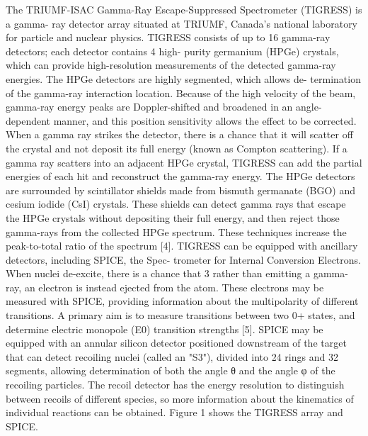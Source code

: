 The TRIUMF-ISAC Gamma-Ray Escape-Suppressed Spectrometer (TIGRESS) is a gamma- ray detector array situated at TRIUMF, Canada’s national laboratory for particle and nuclear physics. TIGRESS consists of up to 16 gamma-ray detectors; each detector contains 4 high- purity germanium (HPGe) crystals, which can provide high-resolution measurements of the detected gamma-ray energies. The HPGe detectors are highly segmented, which allows de- termination of the gamma-ray interaction location. Because of the high velocity of the beam, gamma-ray energy peaks are Doppler-shifted and broadened in an angle-dependent manner, and this position sensitivity allows the effect to be corrected.
When a gamma ray strikes the detector, there is a chance that it will scatter off the crystal and not deposit its full energy (known as Compton scattering). If a gamma ray scatters into an adjacent HPGe crystal, TIGRESS can add the partial energies of each hit and reconstruct the gamma-ray energy. The HPGe detectors are surrounded by scintillator shields made from bismuth germanate (BGO) and cesium iodide (CsI) crystals. These shields can detect gamma rays that escape the HPGe crystals without depositing their full energy, and then reject those gamma-rays from the collected HPGe spectrum. These techniques increase the peak-to-total ratio of the spectrum [4].
TIGRESS can be equipped with ancillary detectors, including SPICE, the Spec- trometer for Internal Conversion Electrons. When nuclei de-excite, there is a chance that
3
rather than emitting a gamma-ray, an electron is instead ejected from the atom. These electrons may be measured with SPICE, providing information about the multipolarity of different transitions. A primary aim is to measure transitions between two 0+ states, and determine electric monopole (E0) transition strengths [5]. SPICE may be equipped with an annular silicon detector positioned downstream of the target that can detect recoiling nuclei (called an "S3"), divided into 24 rings and 32 segments, allowing determination of both the angle θ and the angle φ of the recoiling particles. The recoil detector has the energy resolution to distinguish between recoils of different species, so more information about the kinematics of individual reactions can be obtained. Figure 1 shows the TIGRESS array and SPICE.